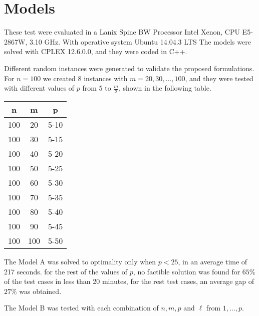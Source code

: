\section{Models}
%

These test were evaluated in
a Lanix Spine BW Processor Intel Xenon,
CPU E5-2867W, 3.10 GHz.
With operative system Ubuntu 14.04.3 LTS
The models were solved with CPLEX 12.6.0.0,
and they were coded in C++.

Different random instances were generated
to validate the proposed formulations.
For $n = 100$ we created 8 instances with $m = 20,30,\ldots,100$,
and they were tested with different values of $p$ from 5 to $\frac{m}{2}$,
shown in the following table.
\begin{table}
  \centerign
  \begin{tabular}{|c|c|c|}\hline
    n & m & p \\ \hline
    100 & 20 & 5-10 \\
    100 & 30 & 5-15 \\
    100 & 40 & 5-20 \\
    100 & 50 & 5-25 \\
    100 & 60 & 5-30 \\
    100 & 70 & 5-35 \\
    100 & 80 & 5-40 \\
    100 & 90 & 5-45 \\
    100 & 100 & 5-50 \\
    \hline
  \end{tabular}
\end{table}

The Model A was solved to optimality only when $p < 25$,
in an average time of 217 seconds.
for the rest of the values of $p$, 
no factible solution was found for $65\%$ of the test cases
in less than 20 minutes,
for the rest test cases,
an average gap of $27\%$ was obtained.

The Model B was tested
with each combination of $n,m,p$
and $\ell$ from $1,\ldots,p$.
